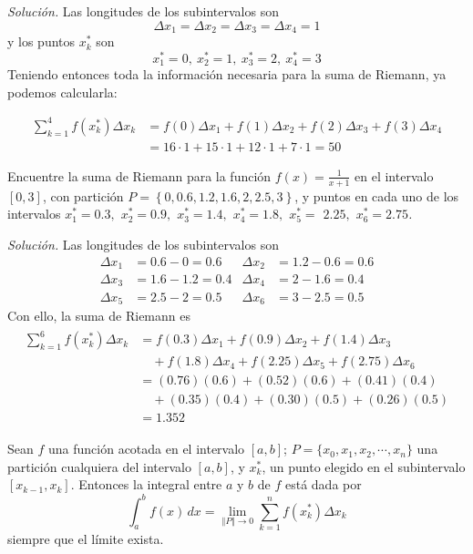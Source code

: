 \emph{Solución.} Las longitudes de los subintervalos son
\[
\Delta x_{1}=\Delta x_{2}=\Delta
x_{3}=\Delta x_{4}=1
\]
y los puntos $x_k^*$ son
\[
x_{1}^{\ast }=0,\ x_{2}^{\ast }=1,\ x_{3}^{\ast }=2,\ x_{4}^{\ast }=3
\]
Teniendo entonces toda la información necesaria para la suma de Riemann, ya podemos calcularla:

\clearpage

\vspace*{-1.5\baselineskip}

\begin{align*}
\sum_{k=1}^{4}f(x_{k}^{\ast })\Delta x_{k}&=f(0)\Delta x_{1}+f(1)\Delta x_{2}+f(2)\Delta x_{3}+f(3)\Delta x_{4}\\
&=16\cdot 1+15\cdot 1+12\cdot 1+7\cdot1=50
\end{align*}

\begin{ejemplo}
Encuentre la suma de Riemann para la función $f(x)=\frac{1}{x+1}$ en
el intervalo $\left[ 0,3\right] $, con partición $P=\left\{0,0.6,1.2,1.6,2,2.5,3\right\}$, y puntos en cada uno de los intervalos \textit{$x_{1}^{\ast }=0.3,$ $x_{2}^{\ast }=0.9,$ $x_{3}^{\ast }=1.4,$ $x_{4}^{\ast}=1.8,$ $x_{5}^{\ast }=$ $2.25,$ $x_{6}^{\ast }=2.75$.}
\end{ejemplo}

\emph{Solución.} Las longitudes de los subintervalos son
\begin{align*}
\Delta x_{1}&=0.6-0=0.6 &
\Delta x_{2}&=1.2-0.6=0.6\\
\Delta x_{3}&=1.6-1.2=0.4&
\Delta x_{4}&=2-1.6=0.4 \\
\Delta x_{5}&=2.5-2=0.5&
\Delta x_{6}&=3-2.5=0.5
\end{align*}
Con ello, la suma de Riemann es
\begin{gather*}
\begin{aligned}
\sum_{k=1}^{6} f(x_{k}^{\ast })\Delta x_{k} &= f(0.3)\Delta
x_{1}+ f(0.9)\Delta x_{2}+f(1.4)\Delta x_{3}\\[-0.9em]
&\quad +f(1.8)\Delta x_{4} + f(2.25)\Delta x_{5}+ f(2.75)\Delta x_{6}\\
&=(0.76)(0.6)+(0.52)(0.6)+(0.41)(0.4)\\
&\quad +(0.35)(0.4)+(0.30)(0.5)+(0.26)(0.5)\\
&=1.352
\end{aligned}
\end{gather*}

\begin{defi}
Sean $f$ una función acotada en el intervalo $[a,b]$; $P=\{x_{0},x_{1},x_{2},\cdots ,x_{n}\}$ una partición cualquiera del intervalo $[a,b]$, y $x_{k}^{\ast }$, un punto elegido en el subintervalo $\left[x_{k-1},x_{k}\right]$. Entonces la integral entre $a$ y $b$ de $f$ está dada por
\begin{equation}\label{defintegral}
\int_{a}^{b}f(x)\,dx=\underset{\left\Vert P\right\Vert \rightarrow 0}{\lim }
\sum_{k=1}^{n}f(x_{k}^{\ast })\Delta x_{k}
\end{equation}
siempre que el límite exista.
\end{defi}

